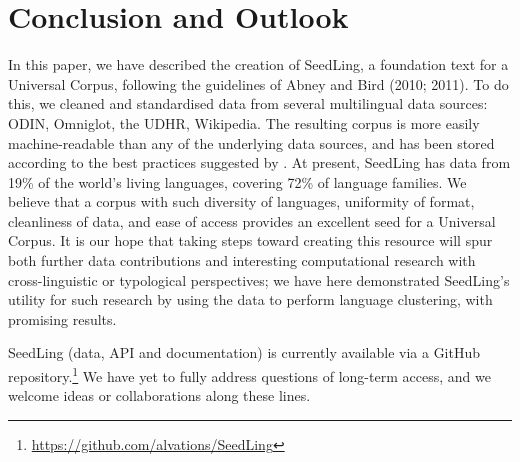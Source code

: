 \section{Conclusion and Outlook} \label{sec:conclusion}

In this paper, we have described the creation of SeedLing, a foundation text for a Universal Corpus, following the guidelines of Abney and Bird (2010; 2011). To do this, we cleaned and standardised data from several multilingual data sources: ODIN, Omniglot, the UDHR, Wikipedia. The resulting corpus is more easily machine-readable than any of the underlying data sources, and has been stored according to the best practices suggested by . At present, SeedLing has data from 19\% of the world's living languages, covering 72\% of language families. We believe that a corpus with such diversity of languages, uniformity of format, cleanliness of data, and ease of access provides an excellent seed for a Universal Corpus. It is our hope that taking steps toward creating this resource will spur both further data contributions and interesting computational research with cross-linguistic or typological perspectives; we have here demonstrated SeedLing's utility for such research by using the data to perform language clustering, with promising results.

SeedLing (data, API and documentation) is currently available via a GitHub repository.\footnote{\url{https://github.com/alvations/SeedLing}} We have yet to fully address questions of long-term access, and we welcome ideas or collaborations along these lines.
